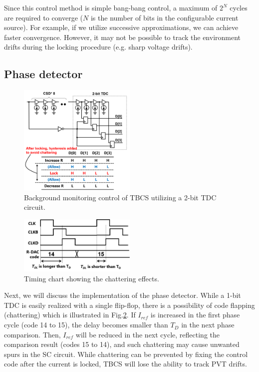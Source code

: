 \documentclass[paper]{ieice}
\begin{document}
Since this control method is simple bang-bang control, a maximum of $2^N$ cycles are required to converge ($N$ is the number of bits in the configurable current source). For example, if we utilize successive approximations, we can achieve faster convergence. However, it may not be possible to track the environment drifts during the locking procedure (e.g. sharp voltage drifts).

\subsection{Phase detector}

\begin{figure}[!t]
\centering
 \includegraphics[width=0.5\textwidth]{figs/tdc.png}
  \caption{Background monitoring control of TBCS utilizing a 2-bit TDC circuit.}
\label{tdc}
\end{figure}

\begin{figure}[!t]
\centering
 \includegraphics[width=0.5\textwidth]{figs/chattering.png}
  \caption{Timing chart showing the chattering effects.}
\label{chattering}
\end{figure}

\qquad Next, we will discuss the implementation of the phase detector. While a 1-bit TDC is easily realized with a single flip-flop, there is a possibility of code flapping (chattering) which is illustrated in Fig.\ref{chattering}. If $I_{ref}$ is increased in the first phase cycle (code 14 to 15), the delay becomes smaller than $T_D$ in the next phase comparison. Then, $I_{ref}$ will be reduced in the next cycle, reflecting the comparison result (codes 15 to 14), and such chattering may cause unwanted spurs in the SC circuit. While chattering can be prevented by fixing the control code after the current is locked, TBCS will lose the ability to track PVT drifts.
\end{document}
